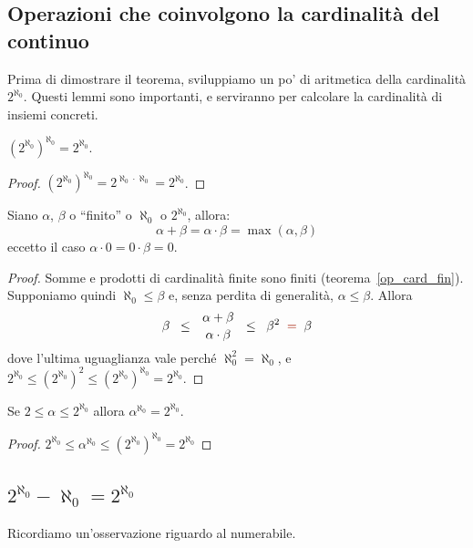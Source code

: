 \subsection{Operazioni che coinvolgono la cardinalit\`a del continuo}
Prima di dimostrare il teorema, sviluppiamo un po' di aritmetica della
cardinalit\`a $2^{\aleph_0}$. {\drkred Questi lemmi sono importanti, e serviranno per calcolare 
la cardinalit\`a di insiemi concreti.}

\begin{remark}
	$(2^{\aleph_0})^{\aleph_0} = 2^{\aleph_0}$.
\end{remark}

\begin{proof}
$(2^{\aleph_0})^{\aleph_0} = 2^{\aleph_0 \cdot \aleph_0} = 2^{\aleph_0}$.
\end{proof}

\begin{lemma}
	\label{prodotto_cardinali_senza_AC}
	Siano $\alpha$, $\beta$ o ``finito'' o $\aleph_0$ o $2^{\aleph_0}$, allora:
	\[ \alpha + \beta = \alpha \cdot \beta = \max(\alpha,\beta)
		\]
	{\drkred eccetto il caso} $\alpha \cdot 0 = 0 \cdot \beta = 0$.
\end{lemma}

\begin{proof}
	Somme e prodotti di cardinalit\`a finite sono finiti
(teorema~\ref{op_card_fin}). 
Supponiamo quindi $\aleph_0 \leq \beta$ e, senza perdita di generalit\`a,
$\alpha \le \beta$. Allora
\[
\beta \;\;\le\;\; {\alpha+\beta \atop \alpha\cdot\beta} \;\;\le\;\;
\beta^2 \;\;{\drkred =}\;\;\beta
\]
	dove l'ultima uguaglianza vale perch\'e $\aleph_0^2 = \aleph_0$, e
$2^{\aleph_0} \leq (2^{\aleph_0})^2 \leq (2^{\aleph_0})^{\aleph_0}  =
2^{\aleph_0}$.
\end{proof}

\begin{lemma}
	Se $2 \leq \alpha \leq 2^{\aleph_0}$ allora $\alpha^{\aleph_0} = 2^{\aleph_0}$.
\end{lemma}

\begin{proof}
	$2^{\aleph_0} \leq \alpha^{\aleph_0} \leq (2^{\aleph_0})^{\aleph_0} = 2^{\aleph_0}
		$
\end{proof}

\subsection{$2^{\aleph_0} - \aleph_0 = 2^{\aleph_0}$}
Ricordiamo un'osservazione riguardo al numerabile.

